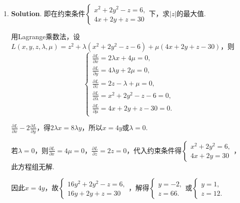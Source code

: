 \documentclass[../Main.tex]{subfiles}
\begin{document}
\begin{enumerate}
          则$\nabla F = (2x,2y,1)$. 令$\nabla F // (1,1,1)$，得$x=y=\frac{1}{2}$，

          代入方程可得$z=\frac{1}{2}$，所以切平面方程为$x-\frac{1}{2}+y-\frac{1}{2}+z
              -\frac{1}{2}=0$，即$2x + 2y + 2z = 3$.

    \item \textbf{Solution}. 即在约束条件$\begin{cases}
                  x^{2}+2y^{2}-z=6, \\
                  4x+2y+z=30
              \end{cases}$下，求$|z|$的最大值.

          用Lagrange乘数法，设$L(x,y,z,\lambda,\mu) = z^{2} + \lambda(x^{2}+2y^{2}-z-
              6) + \mu(4x+2y+z-30)$，则
          \[
              \begin{cases}
                  \frac{\partial L}{\partial x}= 2\lambda x + 4\mu = 0,        \\[6pt]
                  \frac{\partial L}{\partial y}= 4\lambda y + 2\mu = 0,        \\[6pt]
                  \frac{\partial L}{\partial z}= 2z - \lambda + \mu = 0,       \\[6pt]
                  \frac{\partial L}{\partial \lambda}= x^{2}+2y^{2}-z - 6 = 0, \\[6pt]
                  \frac{\partial L}{\partial \mu}= 4x+2y+z-30 = 0.
              \end{cases}
          \]

          $\frac{\partial L}{\partial x}-2\frac{\partial L}{\partial y}$，得$2\lambda
              x = 8\lambda y$，所以$x=4y$或$\lambda=0$.

          若$\lambda=0$，则$\frac{\partial L}{\partial x}= 4\mu = 0$，$\frac{\partial
                  L}{\partial z}= 2z = 0$，代入约束条件得$\begin{cases}
                  x^{2}+2y^{2}=6, \\
                  4x+2y=30
              \end{cases}$，此方程组无解.

          因此$x=4y$，故$\begin{cases}
                  16y^{2}+2y^{2}-z=6, \\
                  16y+2y+z=30
              \end{cases}$，解得$\begin{cases}
                  y=-2, \\
                  z=66.
              \end{cases}$或$\begin{cases}
                  y=1, \\
                  z=12.
              \end{cases}$


\end{enumerate}
\end{document}
